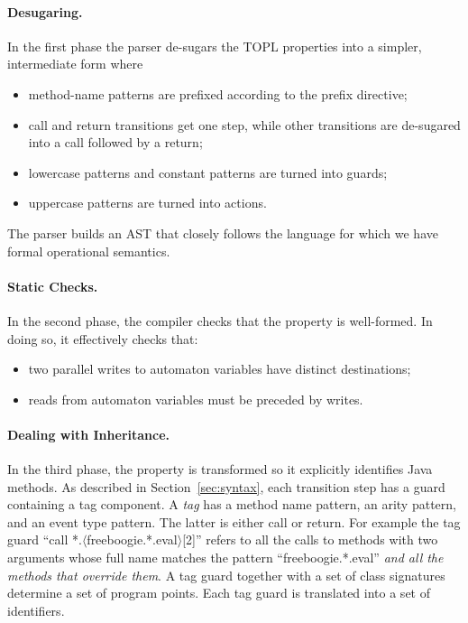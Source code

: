 \documentclass{sigplanconf}[10pt] %
\begin{document}
\paragraph{Desugaring.}
In the first phase the parser de-sugars the TOPL properties into a simpler, intermediate form where
\begin{itemize}
\item method-name patterns are prefixed according to the \textsf{prefix} directive;
\item \textsf{call} and \textsf{return} transitions get one step, while other transitions are de-sugared into a \textsf{call} followed by a \textsf{return};
\item lowercase patterns and constant patterns are turned into guards;
\item uppercase patterns are turned into actions.
\end{itemize}
The parser builds an AST that closely follows the language for which we have formal operational semantics.

\paragraph{Static Checks.}
In the second phase, the compiler checks that the property is well-formed.
In doing so, it effectively checks that:
\begin{itemize}
\item two parallel writes to automaton variables have distinct destinations;
\item reads from automaton variables must be preceded by writes.
\end{itemize}

\paragraph{Dealing with Inheritance.}
In the third phase, the property is transformed so it explicitly identifies Java methods.
As described in Section~\ref{sec:syntax}, each transition step has a guard containing a tag component.
A \emph{tag} has a method name pattern, an arity pattern, and an event type pattern.
The latter is either \textsf{call} or \textsf{return}.
For example the tag guard ``\textsf{call *.$\langle$freeboogie.*.eval$\rangle$[2]}'' refers to all the calls to methods with two arguments whose full name matches the pattern ``\textsf{freeboogie.*.eval}'' \emph{and all the methods that override them}.
A tag guard together with a set of class signatures determine a set of program points.
Each tag guard is translated into a set of identifiers.
\end{document}
